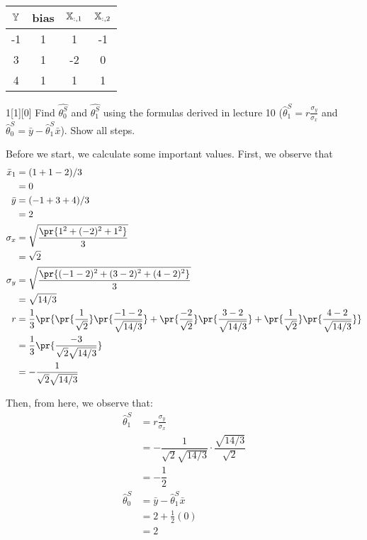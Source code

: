 \documentclass{article}
\begin{document}
\begin{table}[h]
	\centering
	\begin{tabular}{|c|c|c|c|}
		\hline
		$\Bbb{Y}$ & bias & $\Bbb{X}_{:,1}$ & $\Bbb{X}_{:,2}$ \\
		\hline
		-1 & 1 & 1 & -1\\
		3 & 1 & -2 & 0\\
		4 & 1 & 1 & 1\\
		\hline
	\end{tabular}
\end{table}

\begin{dshw}{1}[1][0]
	Find $\hat{\theta_0^{S}}$ and $\hat{\theta_1^{S}}$ using the formulas derived in lecture 10
	($\hat{\theta}_1^S = r\frac{\sigma_y}{\sigma_x}$ and $\hat{\theta}_0^S = \bar{y} - \hat{\theta}_1^S \bar{x}$). Show all steps.
\end{dshw}
\begin{solution}
	Before we start, we calculate some important values. First, we observe that
	\begin{align*}
		\bar x_{1} &= (1+1-2)/3 \\
		&= 0 \\
		\bar y &= (-1+3+4)/3 \\
		&= 2 \\
		\sigma_x &= \sqrt{\dfrac{\pr{1^{2} + (-2)^{2} + 1^{2}}}{3}} \\
		&= \sqrt{2} \\
		\sigma_y &= \sqrt{\dfrac{\pr{(-1 - 2)^{2} + (3-2)^{2} + (4-2)^{2}}}{3}} \\
		&= \sqrt{14/3} \\
		r &= \frac{1}{3} \pr{ \pr{\dfrac{1}{\sqrt 2}}\pr{\dfrac{-1-2}{\sqrt {14/3}}} + \pr{\dfrac{-2}{\sqrt 2}}\pr{\dfrac{3-2}{\sqrt {14/3}}} + \pr{\dfrac{1}{\sqrt 2}}\pr{\dfrac{4-2}{\sqrt {14/3}}} } \\
		&= \dfrac{1}{3}\pr{\dfrac{-3}{\sqrt 2 \sqrt {14/3}}} \\
		&= -\dfrac{1}{\sqrt 2 \sqrt {14/3}}
	\end{align*}
	
	Then, from here, we observe that:
	\begin{align*}
		\hat\theta_1^{S} &= r \frac{\sigma_y}{\sigma_x} \\
		&= -\dfrac{1}{\sqrt 2 \sqrt{14/3}} \cdot \dfrac{\sqrt{14/3}}{\sqrt 2} \\
		&= -\dfrac{1}{2} \\
		\hat\theta_0^{S} &= \bar y - \hat\theta_1^{S} \bar x \\
		&= 2 + \frac{1}{2}(0) \\
		&= 2
	\end{align*}
\end{solution}
\end{document}
